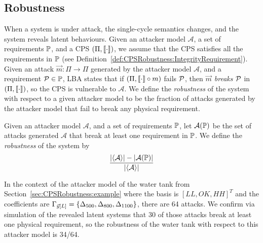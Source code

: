 {{\subsection{Robustness}
When a system is under attack, the single-cycle semantics changes, and the system reveals {latent behaviours}. Given an attacker model $\mathcal{A}$, a set of requirements $\mathbb{P}$, and a CPS $(\Pi,{{{\llbracket\cdot\rrbracket}}})$, we assume that the CPS satisfies all the requirements in $\mathbb{P}$ (see Definition~\ref{def:CPSRobustness:IntegrityRequirement}). Given an attack $\vec{m}\colon \Pi\rightarrow \Pi$ generated by the attacker model $\mathcal{A}$, and a requirement $\mathcal{P}\in\mathbb{P}$, LBA states that if $(\Pi,{{{\llbracket\cdot\rrbracket}}}\circ m)$ fails $\mathcal{P}$, then \emph{$\vec{m}$ breaks $\mathcal{P}$} in $(\Pi,{{{\llbracket\cdot\rrbracket}}})$, so the CPS is vulnerable to $\mathcal{A}$. %
We define the \emph{robustness} of the system with respect to a given attacker model to be the fraction of attacks generated by the attacker model that fail to break any physical requirement. 

\begin{definition}[Robustness]
  \label{def:CPSRobustness:Robustness}
  Given an attacker model $\mathcal{A}$, and a set of requirements $\mathbb{P}$, let $\mathcal{A}(\mathbb{P})$ be the set of attacks generated $\mathcal{A}$ that break at least one requirement in $\mathbb{P}$. We define 
  the \emph{robustness} of the system by 
  \begin{align*}
    \frac{|{{\left<\mathcal{A}\right>}}|-|\mathcal{A}(\mathbb{P})|}{|{{\left<\mathcal{A}\right>}}|}
  \end{align*}
\end{definition}

\begin{example}
  In the context of the attacker model of the water tank from Section~\ref{sec:CPSRobustness:example} where the basis is $[LL, OK, HH]^T$ and the coefficients are $\Gamma_{\vec{y}[L]}=\left\{{\Delta}_{500}, {\Delta}_{800},  {\Delta}_{1100}\right\}$, there are 64 attacks. We confirm via simulation of the revealed latent systems that 30 of those attacks break at least one physical requirement, so the robustness of the water tank with respect to this attacker model is 34/64.
\end{example}
}}
